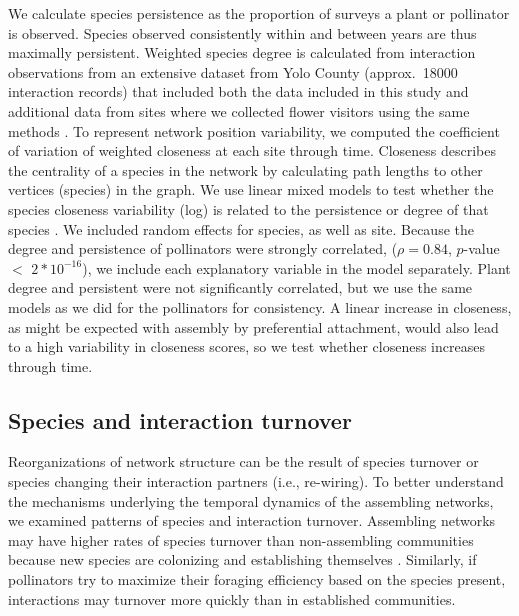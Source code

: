 \documentclass[12pt]{article}
\begin{document}
We calculate species persistence as the proportion of surveys a plant
or pollinator is observed. Species observed consistently within and
between years are thus maximally persistent. Weighted species degree
is calculated from interaction observations from an extensive dataset
from Yolo County (approx.~18000 interaction records) that included
both the data included in this study and additional data from sites
where we collected flower visitors using the same methods
\citep{mgonigle-2015-x, ponisio2015farm}. To represent network
position variability, we computed the coefficient of variation of
weighted closeness at each site through time. Closeness describes the
centrality of a species in the network by calculating path lengths to
other vertices (species) in the graph. We use linear mixed models to
test whether the species closeness variability (log) is related to the
persistence or degree of that species \citep{lme4, lmetest}. We
included random effects for species, as well as site. Because the
degree and persistence of pollinators were strongly correlated, ($\rho
= 0.84$, $p$-value $<$ $2*10^{-16}$), we include each explanatory
variable in the model separately. Plant degree and persistent were not
significantly correlated, but we use the same models as we did for the
pollinators for consistency. A linear increase in closeness, as might
be expected with assembly by preferential attachment, would also lead
to a high variability in closeness scores, so we test whether
closeness increases through time.

\subsection*{Species and interaction turnover}

Reorganizations of network structure can be the result of species
turnover or species changing their interaction partners (i.e.,
re-wiring). To better understand the mechanisms underlying the
temporal dynamics of the assembling networks, we examined patterns of
species and interaction turnover. Assembling networks may have higher
rates of species turnover than non-assembling communities because new
species are colonizing and establishing themselves
\citep{mgonigle-2015-x}. Similarly, if pollinators try to maximize
their foraging efficiency based on the species present, interactions
may turnover more quickly than in established communities.
\end{document}
